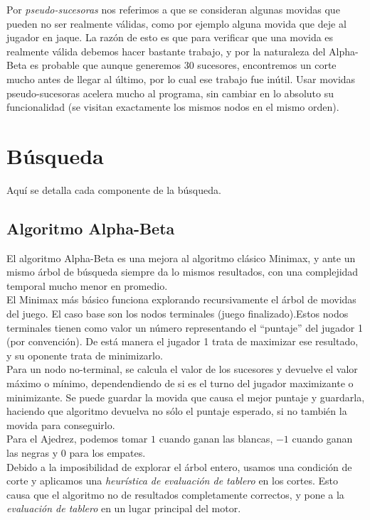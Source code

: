 \documentclass{article}
\begin{document}
\begin{multicols}{2}
Por \emph{pseudo-sucesoras} nos referimos a que se consideran algunas
movidas que pueden no ser realmente válidas, como por ejemplo
alguna movida que deje al jugador en jaque. La razón de esto es que
para verificar que una movida es realmente válida debemos hacer
bastante trabajo, y por la naturaleza del Alpha-Beta es probable que
aunque generemos 30 sucesores, encontremos un corte mucho antes de
llegar al último, por lo cual ese trabajo fue inútil. Usar movidas
pseudo-sucesoras acelera mucho al programa, sin cambiar en lo absoluto
su funcionalidad (se visitan exactamente los mismos nodos en el mismo
orden).
\\

\section{Búsqueda}
Aquí se detalla cada componente de la búsqueda.

\subsection{Algoritmo Alpha-Beta}

El algoritmo Alpha-Beta es una mejora al algoritmo clásico Minimax, y
ante un mismo árbol de búsqueda siempre da lo mismos resultados, con
una complejidad temporal mucho menor en promedio.
\\

El Minimax más básico funciona explorando recursivamente el árbol
de movidas del juego. El caso base son los nodos terminales (juego
finalizado).Estos nodos terminales tienen como valor un número
representando el ``puntaje'' del jugador 1 (por convención). De está
manera el jugador 1 trata de maximizar ese resultado, y su oponente
trata de minimizarlo.
\\

Para un nodo no-terminal, se calcula el valor de los sucesores y
devuelve el valor máximo o mínimo, dependendiendo de si es el turno
del jugador maximizante o minimizante. Se puede guardar la movida
que causa el mejor puntaje y guardarla, haciendo que algoritmo
devuelva no sólo el puntaje esperado, si no también la movida
para conseguirlo.
\\

Para el Ajedrez, podemos tomar $1$ cuando ganan las blancas, $-1$ cuando
ganan las negras y $0$ para los empates.
\\

Debido a la imposibilidad de explorar el árbol entero, usamos una
condición de corte y aplicamos una \emph{heurística de evaluación de
tablero} en los cortes. Esto causa que el algoritmo no de resultados
completamente correctos, y pone a la \emph{evaluación de tablero} en
un lugar principal del motor.
\\


\end{multicols}
\end{document}
